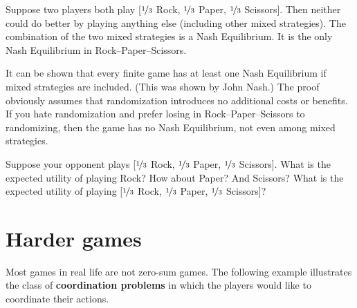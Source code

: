Suppose two players both play [$\nicefrac{1}{3}$ Rock, $\nicefrac{1}{3}$ Paper,
$\nicefrac{1}{3}$ Scissors]. Then neither could do better by playing anything
else (including other mixed strategies). The combination of the two mixed
strategies is a Nash Equilibrium. It is the only Nash Equilibrium in
Rock--Paper--Scissors.

It can be shown that every finite game has at least one Nash Equilibrium if
mixed strategies are included. (This was shown by John Nash.) The proof
obviously assumes that randomization introduces no additional costs or benefits.
If you hate randomization and prefer losing in Rock--Paper--Scissors to
randomizing, then the game has no Nash Equilibrium, not even among mixed
strategies.

\begin{exercise}{2}
  Suppose your opponent plays [$\nicefrac{1}{3}$ Rock, $\nicefrac{1}{3}$ Paper,
  $\nicefrac{1}{3}$ Scissors]. What is the expected utility of playing Rock? How
  about Paper? And Scissors? What is the expected utility of playing
  [$\nicefrac{1}{3}$ Rock, $\nicefrac{1}{3}$ Paper, $\nicefrac{1}{3}$ Scissors]?
\end{exercise}

\section{Harder games}

Most games in real life are not zero-sum games. The following example
illustrates the class of \textbf{coordination problems} in which the players
would like to coordinate their actions.

